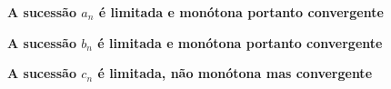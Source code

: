 \documentclass[20pt, a4paper]{extarticle}
\begin{document}
\begin{questoes}
\item
\begin{center}
\label{fig:an}
\end{center}
\centering \textbf{A sucessão $a_{n}$ é limitada e monótona portanto convergente}

\begin{center}
	\label{fig:bn}
\end{center}
\centering \textbf{A sucessão $b_{n}$ é limitada e monótona portanto convergente}

\begin{center}
	\label{fig:cn}
\end{center}
\centering \textbf{A sucessão $c_{n}$ é limitada, não monótona mas convergente}


\end{questoes}
\end{document}
